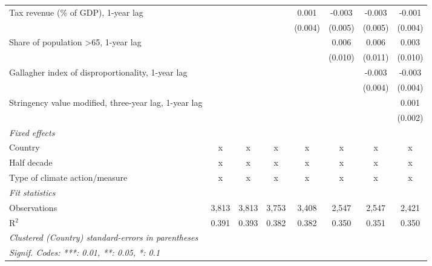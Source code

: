\begin{tabular}{lccccccc}
   Tax revenue (\% of GDP), 1-year lag                               &                &               &              & 0.001       & -0.003  & -0.003  & -0.001\\   
                                                                     &                &               &              & (0.004)     & (0.005) & (0.005) & (0.004)\\   
   Share of population >65, 1-year lag                               &                &               &              &             & 0.006   & 0.006   & 0.003\\   
                                                                     &                &               &              &             & (0.010) & (0.011) & (0.010)\\   
   Gallagher index of disproportionality, 1-year lag                 &                &               &              &             &         & -0.003  & -0.003\\   
                                                                     &                &               &              &             &         & (0.004) & (0.004)\\   
   Stringency value modified, three-year lag, 1-year lag             &                &               &              &             &         &         & 0.001\\   
                                                                     &                &               &              &             &         &         & (0.002)\\   
   \emph{Fixed effects}\\
   Country                                                           & x              & x             & x            & x           & x       & x       & x\\  
   Half decade                                                       & x              & x             & x            & x           & x       & x       & x\\  
   Type of climate action/measure                                    & x              & x             & x            & x           & x       & x       & x\\  
   \midrule \emph{Fit statistics}\\
   Observations                                                      & 3,813          & 3,813         & 3,753        & 3,408       & 2,547   & 2,547   & 2,421\\  
   R$^2$                                                             & 0.391          & 0.393         & 0.382        & 0.382       & 0.350   & 0.351   & 0.350\\  
   \midrule
   \multicolumn{8}{l}{\emph{Clustered (Country) standard-errors in parentheses}}\\
   \multicolumn{8}{l}{\emph{Signif. Codes: ***: 0.01, **: 0.05, *: 0.1}}\\
\end{tabular}
\par\endgroup


